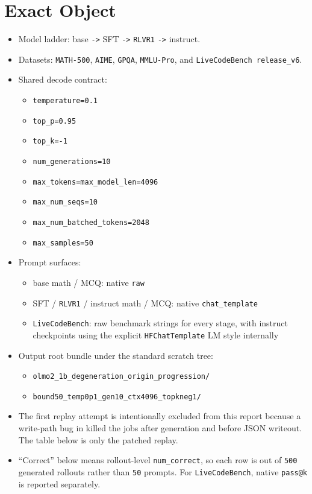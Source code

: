 \documentclass[11pt]{article}
\begin{document}
\section*{Exact Object}
\begin{itemize}[leftmargin=1.5em]
\item Model ladder: base \texttt{->} SFT \texttt{->} \texttt{RLVR1} \texttt{->} instruct.
\item Datasets: \texttt{MATH-500}, \texttt{AIME}, \texttt{GPQA}, \texttt{MMLU-Pro}, and \texttt{LiveCodeBench release\_v6}.
\item Shared decode contract:
  \begin{itemize}[leftmargin=1.5em]
  \item \texttt{temperature=0.1}
  \item \texttt{top\_p=0.95}
  \item \texttt{top\_k=-1}
  \item \texttt{num\_generations=10}
  \item \texttt{max\_tokens=max\_model\_len=4096}
  \item \texttt{max\_num\_seqs=10}
  \item \texttt{max\_num\_batched\_tokens=2048}
  \item \texttt{max\_samples=50}
  \end{itemize}
\item Prompt surfaces:
  \begin{itemize}[leftmargin=1.5em]
  \item base math / MCQ: native \texttt{raw}
  \item SFT / \texttt{RLVR1} / instruct math / MCQ: native \texttt{chat\_template}
  \item \texttt{LiveCodeBench}: raw benchmark strings for every stage, with instruct checkpoints using the explicit \texttt{HFChatTemplate} LM style internally
  \end{itemize}
\item Output root bundle under the standard scratch tree:
  \begin{itemize}[leftmargin=1.5em]
  \item \texttt{olmo2\_1b\_degeneration\_origin\_progression/}
  \item \texttt{bound50\_temp0p1\_gen10\_ctx4096\_topkneg1/}
  \end{itemize}
\item The first replay attempt is intentionally excluded from this report because a write-path bug in  killed the jobs after generation and before JSON writeout. The table below is only the patched replay.
\item ``Correct'' below means rollout-level \texttt{num\_correct}, so each row is out of \texttt{500} generated rollouts rather than \texttt{50} prompts. For \texttt{LiveCodeBench}, native \texttt{pass@k} is reported separately.
\end{itemize}
\end{document}
